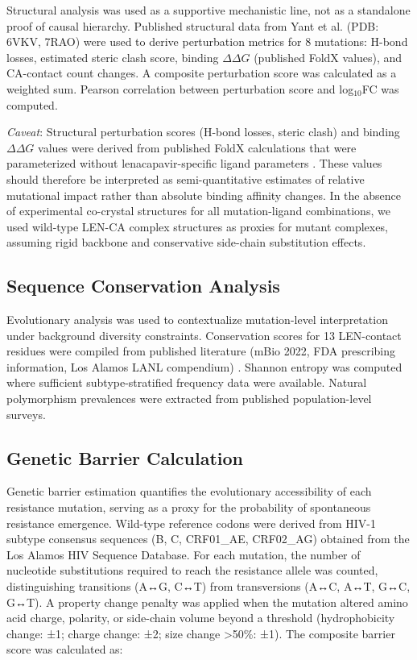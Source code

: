 \documentclass[12pt,a4paper]{article}
\begin{document}
Structural analysis was used as a supportive mechanistic line, not as a standalone proof of causal hierarchy. Published structural data from Yant et al. \cite{Yant2022} (PDB: 6VKV, 7RAO) were used to derive perturbation metrics for 8 mutations: H-bond losses, estimated steric clash score, binding $\Delta\Delta G$ (published FoldX values), and CA-contact count changes. A composite perturbation score was calculated as a weighted sum. Pearson correlation between perturbation score and log$_{10}$FC was computed.

\textit{Caveat}: Structural perturbation scores (H-bond losses, steric clash) and binding $\Delta\Delta G$ values were derived from published FoldX calculations that were parameterized without lenacapavir-specific ligand parameters \cite{Yant2022}. These values should therefore be interpreted as semi-quantitative estimates of relative mutational impact rather than absolute binding affinity changes. In the absence of experimental co-crystal structures for all mutation-ligand combinations, we used wild-type LEN-CA complex structures as proxies for mutant complexes, assuming rigid backbone and conservative side-chain substitution effects.

\subsection{Sequence Conservation Analysis}

Evolutionary analysis was used to contextualize mutation-level interpretation under background diversity constraints. Conservation scores for 13 LEN-contact residues were compiled from published literature (mBio 2022, FDA prescribing information, Los Alamos LANL compendium) \cite{Yant2022}. Shannon entropy was computed where sufficient subtype-stratified frequency data were available. Natural polymorphism prevalences were extracted from published population-level surveys.

\subsection{Genetic Barrier Calculation}

Genetic barrier estimation quantifies the evolutionary accessibility of each resistance mutation, serving as a proxy for the probability of spontaneous resistance emergence. Wild-type reference codons were derived from HIV-1 subtype consensus sequences (B, C, CRF01\_AE, CRF02\_AG) obtained from the Los Alamos HIV Sequence Database. For each mutation, the number of nucleotide substitutions required to reach the resistance allele was counted, distinguishing transitions (A↔G, C↔T) from transversions (A↔C, A↔T, G↔C, G↔T). A property change penalty was applied when the mutation altered amino acid charge, polarity, or side-chain volume beyond a threshold (hydrophobicity change: ±1; charge change: ±2; size change >50\%: ±1). The composite barrier score was calculated as:
\end{document}
